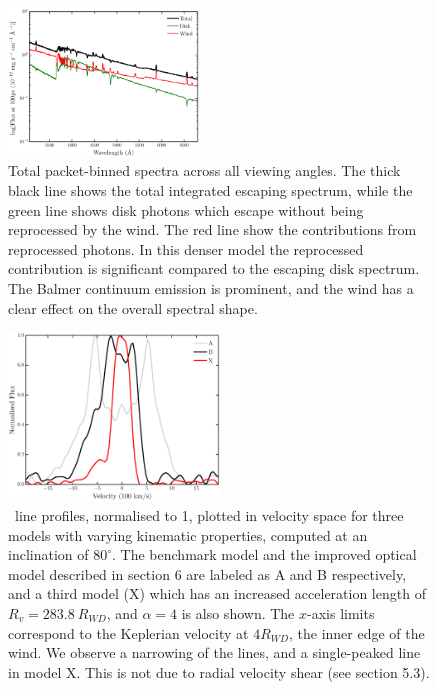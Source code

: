 \documentclass[preprint, a4paper, 11pt]{aastex}
\begin{document}
\begin{figure} 
\includegraphics[width=0.45\textwidth]{figures/modelb_escaping.eps}
\caption{Total packet-binned spectra across all viewing angles. 
The thick black line shows the total 
integrated escaping spectrum, 
while the green line shows disk photons which escape without being reprocessed by
the wind. The red line show the contributions from reprocessed 
photons. 
In this denser model the reprocessed contribution is significant compared
to the escaping disk spectrum. The Balmer continuum emission is prominent, and
the wind has a clear effect on the overall spectral shape.}
\label{modelb_escape}
\end{figure} 

\begin{figure}
\includegraphics[width=0.5\textwidth]{figures/mc.eps}
\caption{
\ha\ line profiles, normalised to 1, plotted in velocity space 
for three models with varying kinematic 
properties, computed at an inclination of $80^\circ$.
The benchmark model and the improved optical
model described in section 6 are labeled as A and B respectively,
and a third model (X) which has an increased acceleration length of 
$R_v = 283.8~R_{WD}$, and $\alpha=4$ is also shown. 
The $x$-axis limits correspond to the Keplerian velocity at 
$4R_{WD}$, the inner edge of the wind.
We observe a narrowing of the lines, and a single-peaked line in model X.
This is not due to radial velocity shear (see section 5.3).
}
\label{halpha}
\end{figure} %
\end{document}
